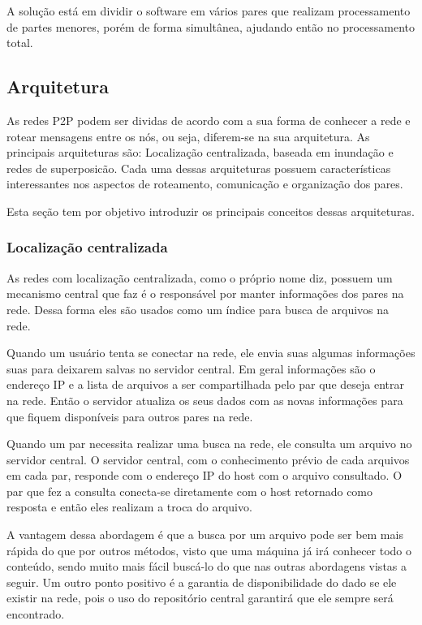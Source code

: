 A solução está em dividir o software em vários pares que realizam processamento de partes menores, porém de forma simultânea, ajudando então no processamento total.

\subsection{Arquitetura}

As redes P2P podem ser dividas de acordo com a sua forma de conhecer a rede e rotear mensagens entre os nós, ou seja, diferem-se na sua arquitetura. As principais arquiteturas são: Localização centralizada, baseada em inundação e redes de superposicão. Cada uma dessas arquiteturas possuem características interessantes nos aspectos de roteamento, comunicação e organização dos pares.

 Esta seção tem por objetivo introduzir os principais conceitos dessas arquiteturas.

\subsubsection{Localização centralizada}

As redes com localização centralizada, como o próprio nome diz, possuem um mecanismo central que faz é o responsável por manter informações dos pares na rede. Dessa forma eles são usados como um índice para busca de arquivos na rede.

Quando um usuário tenta se conectar na rede, ele envia suas algumas informações suas para deixarem salvas no servidor central. Em geral informações são o endereço IP e a lista de arquivos a ser compartilhada pelo par que deseja entrar na rede. Então o servidor atualiza os seus dados com as novas informações para que fiquem disponíveis para outros pares na rede.

Quando um par necessita realizar uma busca na rede, ele consulta um arquivo no servidor central. O servidor central, com o conhecimento prévio de cada arquivos em cada par, responde com o endereço IP do host com o arquivo consultado. O par que fez a consulta conecta-se diretamente com o host retornado como resposta e então eles realizam a troca do arquivo.

A vantagem dessa abordagem é que a busca por um arquivo pode ser bem mais rápida do que por outros métodos, visto que uma máquina já irá conhecer todo o conteúdo, sendo muito mais fácil buscá-lo do que nas outras abordagens vistas a seguir. Um outro ponto positivo é a garantia de disponibilidade do dado se ele existir na rede, pois o uso do repositório central garantirá que ele sempre será encontrado.

